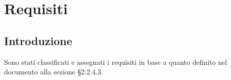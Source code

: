 \section{Requisiti}

\subsection{Introduzione} 

Sono stati classificati e assegnati i requisiti in base a quanto definito nel documento \NdP{} alla sezione §2.2.4.3.


\vspace{0.5cm}

\vspace{0.5cm}

\vspace{0.8cm}

